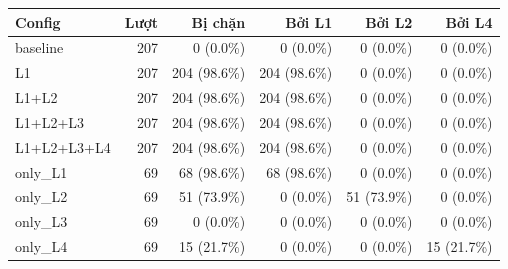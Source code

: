 \begin{tabular}{lrrrrr}
\toprule
Config & Lượt & Bị chặn & Bởi L1 & Bởi L2 & Bởi L4 \\
\midrule
baseline & 207 & 0 (0.0\%) & 0 (0.0\%) & 0 (0.0\%) & 0 (0.0\%) \\
L1 & 207 & 204 (98.6\%) & 204 (98.6\%) & 0 (0.0\%) & 0 (0.0\%) \\
L1+L2 & 207 & 204 (98.6\%) & 204 (98.6\%) & 0 (0.0\%) & 0 (0.0\%) \\
L1+L2+L3 & 207 & 204 (98.6\%) & 204 (98.6\%) & 0 (0.0\%) & 0 (0.0\%) \\
L1+L2+L3+L4 & 207 & 204 (98.6\%) & 204 (98.6\%) & 0 (0.0\%) & 0 (0.0\%) \\
only\_L1 & 69 & 68 (98.6\%) & 68 (98.6\%) & 0 (0.0\%) & 0 (0.0\%) \\
only\_L2 & 69 & 51 (73.9\%) & 0 (0.0\%) & 51 (73.9\%) & 0 (0.0\%) \\
only\_L3 & 69 & 0 (0.0\%) & 0 (0.0\%) & 0 (0.0\%) & 0 (0.0\%) \\
only\_L4 & 69 & 15 (21.7\%) & 0 (0.0\%) & 0 (0.0\%) & 15 (21.7\%) \\
\bottomrule
\end{tabular}
